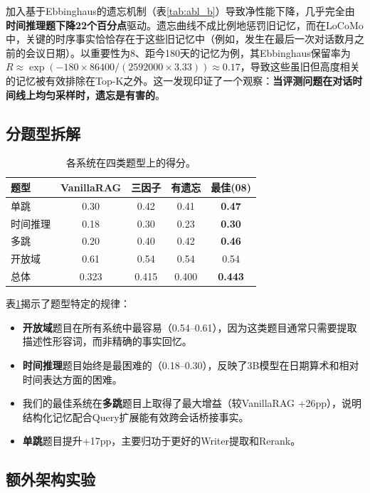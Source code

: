 \documentclass[11pt,a4paper]{ctexart}
\begin{document}
加入基于Ebbinghaus的遗忘机制（表\ref{tab:abl_b}）导致净性能下降，几乎完全由\textbf{时间推理题下降22个百分点}驱动。遗忘曲线不成比例地惩罚旧记忆，而在LoCoMo中，关键的时序事实恰恰存在于这些旧记忆中（例如，发生在最后一次对话数月之前的会议日期）。以重要性为8、距今180天的记忆为例，其Ebbinghaus保留率为$R \approx \exp(-180 \times 86400 / (2592000 \times 3.33)) \approx 0.17$，导致这些虽旧但高度相关的记忆被有效排除在Top-K之外。这一发现印证了一个观察：\textbf{当评测问题在对话时间线上均匀采样时，遗忘是有害的}。

\subsection{分题型拆解}

\begin{table}[H]
\centering
\begin{tabular}{@{}lcccc@{}}
\toprule
\textbf{题型} & \textbf{VanillaRAG} & \textbf{三因子} & \textbf{有遗忘} & \textbf{最佳(08)} \\
\midrule
单跳 & 0.30 & 0.42 & 0.41 & \textbf{0.47} \\
时间推理 & 0.18 & 0.30 & 0.23 & \textbf{0.30} \\
多跳 & 0.20 & 0.40 & 0.42 & \textbf{0.46} \\
开放域 & 0.61 & 0.54 & 0.54 & 0.54 \\
\hline
总体 & 0.323 & 0.415 & 0.400 & \textbf{0.443} \\
\bottomrule
\end{tabular}
\caption{各系统在四类题型上的得分。}
\label{tab:cat}
\end{table}

表\ref{tab:cat}揭示了题型特定的规律：

\begin{itemize}[nosep]
    \item \textbf{开放域}题目在所有系统中最容易（0.54--0.61），因为这类题目通常只需要提取描述性形容词，而非精确的事实回忆。
    \item \textbf{时间推理}题目始终是最困难的（0.18--0.30），反映了3B模型在日期算术和相对时间表达方面的困难。
    \item 我们的最佳系统在\textbf{多跳}题目上取得了最大增益（较VanillaRAG +26pp），说明结构化记忆配合Query扩展能有效跨会话桥接事实。
    \item \textbf{单跳}题目提升+17pp，主要归功于更好的Writer提取和Rerank。
\end{itemize}

\subsection{额外架构实验}
\end{document}
